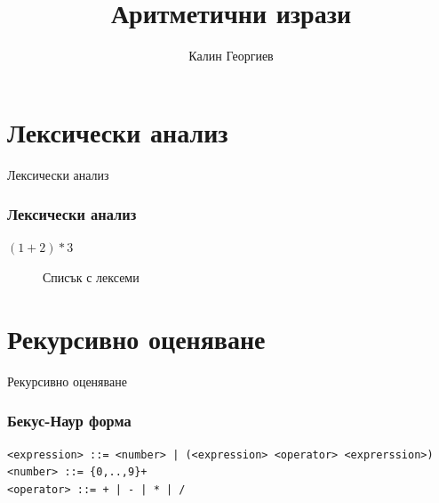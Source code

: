 \documentclass{beamer}
\begin{document}
\title[Структури от данни и програмиране]{Аритметични изрази} 
\author{Калин Георгиев} 
\frame{\titlepage} 

\section{Лексически анализ} 


\begin{frame}
\centerline{Лексически анализ}
\end{frame}

\begin{frame}[fragile]
\frametitle{Лексически анализ}

\begin{center}
  $(1+2)*3$
\end{center}


\begin{figure}
  \centering

  \caption{Списък с лексеми}
  \label{fig:tokenlist}
\end{figure}


\end{frame}


\section{Рекурсивно оценяване} 


\begin{frame}
\centerline{Рекурсивно оценяване}
\end{frame}

\begin{frame}[fragile]
\frametitle{Бекус-Наур форма}
\begin{verbatim}
<expression> ::= <number> | (<expression> <operator> <exprerssion>)
<number> ::= {0,..,9}+
<operator> ::= + | - | * | /

\end{verbatim}

\end{frame}
\end{document}

